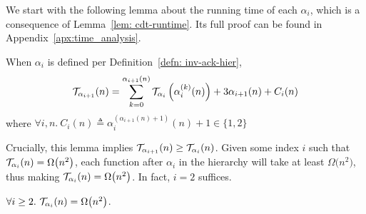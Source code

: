 \noindent We start with the following lemma about the running time of each $\alpha_i$, which is a consequence of Lemma~\ref{lem: cdt-runtime}. Its full proof can be found in Appendix~\ref{apx:time_analysis}.
\begin{lem} \label{lem: inv-ack-hier-runtime}
	When $\alpha_i$ is defined per Definition~\ref{defn: inv-ack-hier},
	\begin{equation*}
	\mathcal{T}_{\alpha_{i+1}}(n) = \sum_{k=0}^{\alpha_{i+1}(n)}\mathcal{T}_{\alpha_i}\left( \alpha_i^{(k)}(n)\right) + 3\alpha_{i+1}(n) + C_i(n)
	\end{equation*}
	\hspace{7em}where $\forall i, n.~C_i(n) \triangleq \alpha_i^{(\alpha_{i+1}(n) + 1)}(n) + 1 \in \{1, 2\}$
\end{lem}
Crucially, this lemma implies $\mathcal{T}_{\alpha_{i+1}}(n) \ge 
\mathcal{T}_{\alpha_i}(n)$. 
Given some index $i$ such that \linebreak $\mathcal{T}_{\alpha_i}(n) = \Omega\big(n^2\big)$, each function after $\alpha_i$ in the hierarchy will take at least $\Omega\big(n^2\big)$, thus making $\mathcal{T}_{\alpha_i} (n) = \Omega\big(n^2\big)$.
In fact, $i = 2$ suffices.
\begin{lem} \label{lem: alpha2_runtime_naive}
	$\forall i\ge 2.~\mathcal{T}_{\alpha_i}(n) = \Omega\big(n^2\big)$.
\end{lem}


